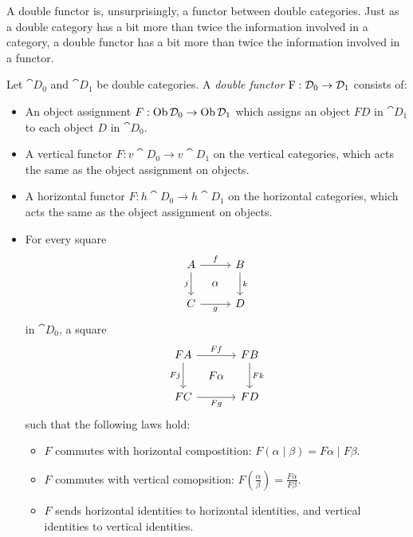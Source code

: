 \documentclass[DynamicalBook]{subfiles}
\begin{document}
A double functor is, unsurprisingly, a functor between double categories. Just
as a double category has a bit more than twice the information involved in a
category, a double functor has a bit more than twice the information involved in
a functor.
 \begin{definition}\label{def.double_functor}
 Let $\cat{D}_0$ and $\cat{D}_1$ be double categories. A \emph{double functor}
 $\mathrm{F} : \mathcal{D}_0 \to \mathcal{D}_1$ consists of:
\begin{itemize}
  \item An object assignment $F : \operatorname{Ob} \mathcal{D}_0 \to \operatorname{Ob} \mathcal{D}_1$ which assigns an object $F D$
    in $\cat{D}_1$ to each object $D$ in $\cat{D}_0$.
  \item A vertical functor $F : v\cat{D}_0 \to v\cat{D}_1$ on the vertical
    categories, which acts the same as the object assignment on objects.
  \item A horizontal functor $F : h\cat{D}_0 \to h\cat{D}_1$ on the horizontal
    categories, which acts the same as the object assignment on objects.
  \item For every square
    \[
        \begin{tikzcd}[sep=tiny]
          A \ar[dd, "j"'] \ar[rr, "f"] & & B \ar[dd, "k"] \\
           & \alpha & \\
          C \ar[rr, "g"'] & & D
        \end{tikzcd}
    \]
    in $\cat{D}_0$, a square
    \[
        \begin{tikzcd}[sep=tiny]
          FA \ar[dd, "Fj"'] \ar[rr, "Ff"] & & FB \ar[dd, "Fk"] \\
           & F\alpha & \\
          FC \ar[rr, "Fg"'] & & FD
        \end{tikzcd}
    \]
    such that the following laws hold:
    \begin{itemize}
    \item $F$ commutes with horizontal compostition: $F(\alpha \mid \beta) = F\alpha \mid F\beta$.
    \item $F$ commutes with vertical comopsition: $F\left( \frac{\alpha}{\beta} \right) = \frac{F\alpha}{F\beta}$.
    \item $F$ sends horizontal identities to horizontal identities, and vertical
      identities to vertical identities.
    \end{itemize}
\end{itemize}
\end{definition}
\end{document}
